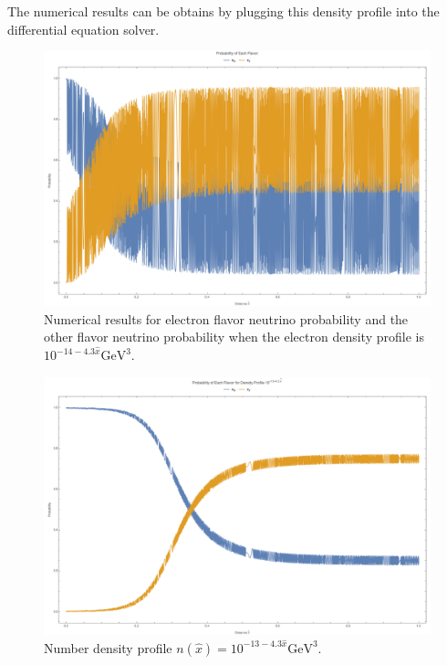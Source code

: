 \documentclass[letterpaper,12pt,english]{sphinxmanual}
\begin{document}
The numerical results can be obtains by plugging this density profile into the differential equation solver.
\begin{figure}[htbp]
\centering
\capstart

\includegraphics{numericalMSW-model-3.png}
\caption{Numerical results for electron flavor neutrino probability and the other flavor neutrino probability when the electron density profile is \(10^{-14 - 4.3\hat x} \mathrm{GeV}^{3}\).}\end{figure}
\begin{figure}[htbp]
\centering
\capstart

\includegraphics{numericalMSW-model-2flavor-minus13-1.png}
\caption{Number density profile \(n(\hat x) =  10^{-13 - 4.3\hat x}\mathrm{GeV^{3}}\).}\end{figure}
\end{document}
